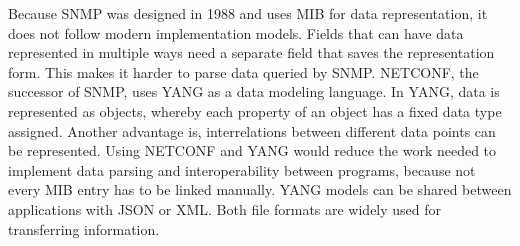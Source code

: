Because SNMP was designed in 1988 and uses MIB for data representation, it does not follow modern implementation models. Fields that can have data represented in multiple ways need a separate field that saves the representation form. This makes it harder to parse data queried by SNMP. NETCONF, the successor of SNMP, uses YANG as a data modeling language. In YANG, data is represented as objects, whereby each property of an object has a fixed data type assigned. Another advantage is, interrelations between different data points can be represented. Using NETCONF and YANG would reduce the work needed to implement data parsing and interoperability between programs, because not every MIB entry has to be linked manually. YANG models can be shared between applications with JSON or XML. Both file formats are widely used for transferring information.
